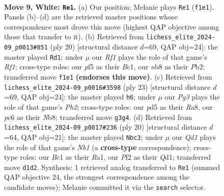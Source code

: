 \documentclass[11pt]{article}
\begin{document}
\clearpage

\begin{figure}[p]\centering
\begin{subfigure}{0.46\textwidth}\centering
\resizebox{\linewidth}{!}{%
\newchessgame
\chessboard[
  setfen={rnbq1rk1/pp4pp/2pb1n2/3p1p2/3P4/1P3NP1/P3PPBP/RNBQ1RK1 w - - 0 9},
  showmover=false,
  pgfstyle=straightmove, color=movearrow, markmove={f1-e1}
]}
\caption{}
\end{subfigure}\hfill
\begin{subfigure}{0.46\textwidth}\centering
\resizebox{\linewidth}{!}{%
\newchessgame
\chessboard[
  setfen={rn1q1rk1/pp3pp1/2pbb2p/4p3/4P3/5NP1/PPP1QPBP/R1B2RK1 w - - 0 11},
  showmover=false,
  pgfstyle=straightmove, color=movearrow, markmove={f1-d1}
]}
\caption{}
\end{subfigure}
\\[4pt]
\begin{subfigure}{0.46\textwidth}\centering
\resizebox{\linewidth}{!}{%
\newchessgame
\chessboard[
  setfen={rnbq1rk1/1p3ppp/p2b1n2/2pP4/2P5/P1NB1N2/1P4PP/R1BQ1RK1 b - - 3 12},
  showmover=false,
  pgfstyle=straightmove, color=movearrow, markmove={h7-h6}
]}
\caption{}
\end{subfigure}\hfill
\begin{subfigure}{0.46\textwidth}\centering
\resizebox{\linewidth}{!}{%
\newchessgame
\chessboard[
  setfen={r1bq1rk1/1pp1bppp/3p1n2/p1nP4/2P5/6P1/PP2NPBP/RNBQ1RK1 w - - 1 11},
  showmover=false,
  pgfstyle=straightmove, color=movearrow, markmove={b1-c3}
]}
\caption{}
\end{subfigure}
\caption{\textbf{Move 9, White: \texttt{Re1}.} (a) Our position; Melanie plays \texttt{Re1} (\texttt{f1e1}). Panels (b)--(d) are the retrieved master positions whose correspondence most drove this move (highest QAP objective among those that transfer to it). (b) Retrieved from \texttt{lichess\_elite\_2024-09\_p0013\#851} (ply 20) [structural distance $d$=69, QAP obj=24]: the master played \texttt{Rd1}; under $\mu$ our \emph{Rf1} plays the role of that game's \emph{Rf1}; cross-type roles: our \emph{p}f5 as their \emph{B}c1, our \emph{n}b8 as their \emph{P}b2; transferred move \texttt{f1e1} \textbf{(endorses this move)}. (c) Retrieved from \texttt{lichess\_elite\_2024-09\_p0016\#3598} (ply 23) [structural distance $d$=69, QAP obj=24]: the master played \texttt{h6}; under $\mu$ our \emph{Pg3} plays the role of that game's \emph{Ph2}; cross-type roles: our \emph{p}d5 as their \emph{R}a8, our \emph{p}c6 as their \emph{N}b8; transferred move \texttt{g3g4}. (d) Retrieved from \texttt{lichess\_elite\_2024-09\_p0017\#236} (ply 20) [structural distance $d$=64, QAP obj=21]: the master played \texttt{Nbc3}; under $\mu$ our \emph{Qd1} plays the role of that game's \emph{Nb1} (a \textbf{cross-type} correspondence); cross-type roles: our \emph{B}c1 as their \emph{R}a1, our \emph{P}f2 as their \emph{Q}d1; transferred move \texttt{d1d2}. Synthesis: 1 retrieved analog transferred to \texttt{Re1} (summed QAP objective 24, the strongest correspondence among the candidate moves); Melanie committed it via the \texttt{search} selector.}
\label{fig:thought-m16}
\end{figure}
\end{document}

